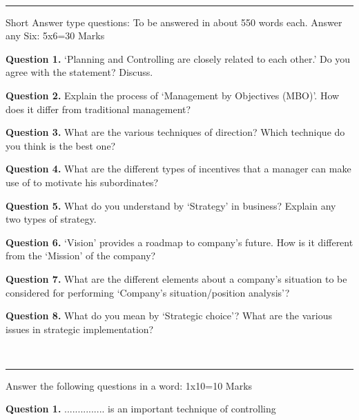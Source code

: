 \documentclass[11pt,a4paper]{article}
\begin{document}
\bigskip


\\[4pt]
\rule{\linewidth}{0.4pt}\smallskip

Short Answer type questions:
To be answered in about 550 words each. Answer any Six: 5x6=30 Marks

\medskip


\noindent   \textbf{Question 1.} ‘Planning and Controlling are closely related to each other.’ Do you agree with the
statement? Discuss.

\medskip


\noindent   \textbf{Question 2.} Explain the process of ‘Management by Objectives (MBO)’. How does it differ from
traditional management?

\medskip


\noindent   \textbf{Question 3.} What are the various techniques of direction? Which technique do you think is the best
one?

\medskip


\noindent   \textbf{Question 4.} What are the different types of incentives that a manager can make use of to motivate
his subordinates?

\medskip


\noindent   \textbf{Question 5.} What do you understand by ‘Strategy’ in business? Explain any two types of strategy.

\medskip


\noindent   \textbf{Question 6.} ‘Vision’ provides a roadmap to company’s future. How is it different from the
‘Mission’ of the company?

\medskip


\noindent   \textbf{Question 7.} What are the different elements about a company's situation to be considered for
performing ‘Company's situation/position analysis’?

\medskip


\noindent   \textbf{Question 8.} What do you mean by ‘Strategic choice’? What are the various issues in strategic
implementation?

\bigskip


\\[4pt]
\rule{\linewidth}{0.4pt}\smallskip

Answer the following questions in a word: 1x10=10 Marks

\medskip


\noindent   \textbf{Question 1.} ............... is an important technique of controlling
\end{document}
